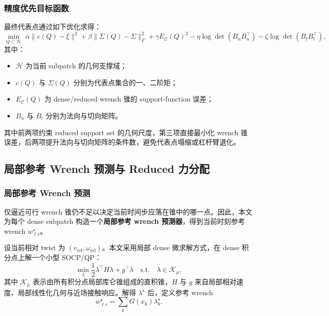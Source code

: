 \subsubsection{精度优先目标函数}

最终代表点通过如下优化求得：
\begin{equation}
\min_{Q\subset \mathcal{H}}
\;
\alpha \|c(Q)-\bar{\xi}\|^2
+\beta \|\Sigma(Q)-\Sigma\|_F^2
+\gamma E_{\mathcal{C}}(Q)^2
-\eta \log\det(B_n B_n^\top)
-\zeta \log\det(B_t B_t^\top),
\end{equation}
其中：
\begin{itemize}[leftmargin=2em]
    \item $\mathcal{H}$ 为当前 subpatch 的几何支撑域；
    \item $c(Q)$ 与 $\Sigma(Q)$ 分别为代表点集合的一、二阶矩；
    \item $E_{\mathcal{C}}(Q)$ 为 dense/reduced wrench 锥的 support-function 误差；
    \item $B_n$ 与 $B_t$ 分别为法向与切向矩阵。
\end{itemize}

其中前两项约束 reduced support set 的几何尺度，第三项直接最小化 wrench 锥误差，后两项提升法向与切向矩阵的条件数，避免代表点塌缩或杠杆臂退化。

\subsection{局部参考 Wrench 预测与 Reduced 力分配}

\subsubsection{局部参考 Wrench 预测}

仅逼近可行 wrench 锥仍不足以决定当前时间步应落在锥中的哪一点。因此，本文为每个 dense subpatch 构造一个\textbf{局部参考 wrench 预测器}，得到当前时刻参考 wrench $w_{\ell r}^\star$。

设当前相对 twist 为 $(v_{\mathrm{rel}}, \omega_{\mathrm{rel}})$。本文采用局部 dense 微求解方式，在 dense 积分点上解一个小型 SOCP/QP：
\begin{equation}
\min_{\lambda}
\frac{1}{2}\lambda^\top H \lambda + g^\top \lambda
\quad
\text{s.t.}\quad
\lambda \in \mathcal{K}_\mu,
\end{equation}
其中 $\mathcal{K}_\mu$ 表示由所有积分点局部库仑锥组成的直积锥，$H$ 与 $g$ 来自局部相对速度、局部线性化几何与近场接触响应。解得 $\lambda^\star$ 后，定义参考 wrench
\begin{equation}
 w_{\ell r}^\star
 =
 \sum_{k} G(x_k)\lambda_k^\star.
\end{equation}

